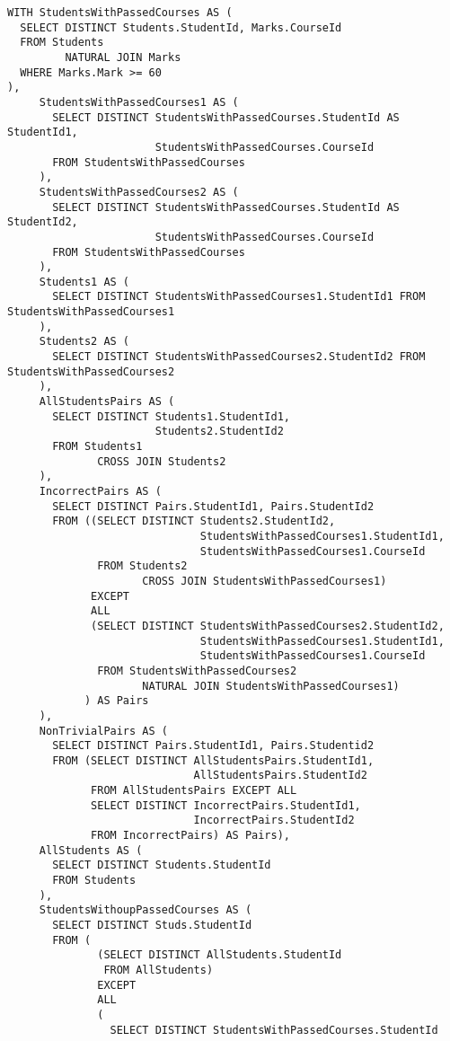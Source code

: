 \documentclass{article}
\begin{document}
\begin{verbatim}
WITH StudentsWithPassedCourses AS (
  SELECT DISTINCT Students.StudentId, Marks.CourseId
  FROM Students
         NATURAL JOIN Marks
  WHERE Marks.Mark >= 60
),
     StudentsWithPassedCourses1 AS (
       SELECT DISTINCT StudentsWithPassedCourses.StudentId AS StudentId1,
                       StudentsWithPassedCourses.CourseId
       FROM StudentsWithPassedCourses
     ),
     StudentsWithPassedCourses2 AS (
       SELECT DISTINCT StudentsWithPassedCourses.StudentId AS StudentId2,
                       StudentsWithPassedCourses.CourseId
       FROM StudentsWithPassedCourses
     ),
     Students1 AS (
       SELECT DISTINCT StudentsWithPassedCourses1.StudentId1 FROM StudentsWithPassedCourses1
     ),
     Students2 AS (
       SELECT DISTINCT StudentsWithPassedCourses2.StudentId2 FROM StudentsWithPassedCourses2
     ),
     AllStudentsPairs AS (
       SELECT DISTINCT Students1.StudentId1,
                       Students2.StudentId2
       FROM Students1
              CROSS JOIN Students2
     ),
     IncorrectPairs AS (
       SELECT DISTINCT Pairs.StudentId1, Pairs.StudentId2
       FROM ((SELECT DISTINCT Students2.StudentId2,
                              StudentsWithPassedCourses1.StudentId1,
                              StudentsWithPassedCourses1.CourseId
              FROM Students2
                     CROSS JOIN StudentsWithPassedCourses1)
             EXCEPT
             ALL
             (SELECT DISTINCT StudentsWithPassedCourses2.StudentId2,
                              StudentsWithPassedCourses1.StudentId1,
                              StudentsWithPassedCourses1.CourseId
              FROM StudentsWithPassedCourses2
                     NATURAL JOIN StudentsWithPassedCourses1)
            ) AS Pairs
     ),
     NonTrivialPairs AS (
       SELECT DISTINCT Pairs.StudentId1, Pairs.Studentid2
       FROM (SELECT DISTINCT AllStudentsPairs.StudentId1,
                             AllStudentsPairs.StudentId2
             FROM AllStudentsPairs EXCEPT ALL
             SELECT DISTINCT IncorrectPairs.StudentId1,
                             IncorrectPairs.StudentId2
             FROM IncorrectPairs) AS Pairs),
     AllStudents AS (
       SELECT DISTINCT Students.StudentId
       FROM Students
     ),
     StudentsWithoupPassedCourses AS (
       SELECT DISTINCT Studs.StudentId
       FROM (
              (SELECT DISTINCT AllStudents.StudentId
               FROM AllStudents)
              EXCEPT
              ALL
              (
                SELECT DISTINCT StudentsWithPassedCourses.StudentId

\end{verbatim}
\end{document}

